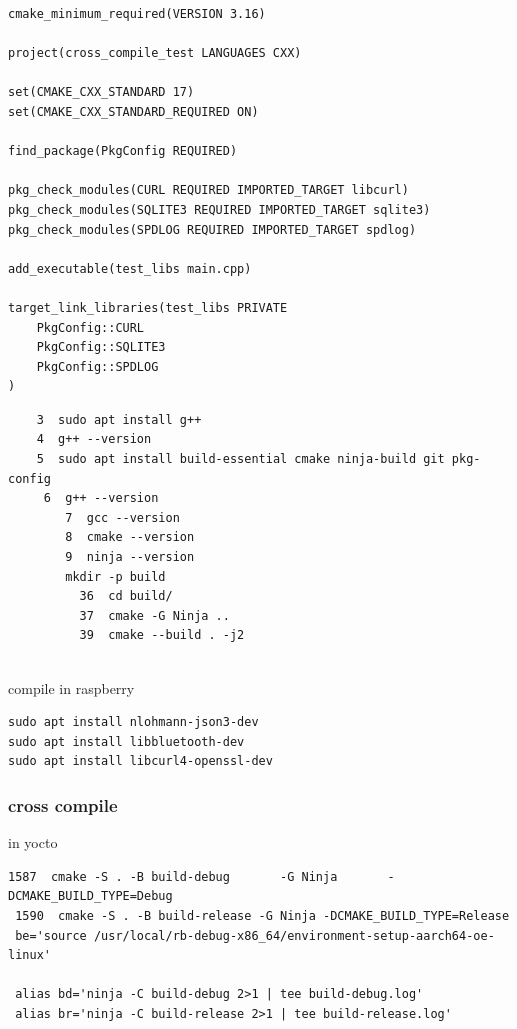 \documentclass[paper=8.5in:11in, twoside, 12pt, pagesize=pdftex]{book}
\begin{document}
\begin{lstlisting}
cmake_minimum_required(VERSION 3.16)

project(cross_compile_test LANGUAGES CXX)

set(CMAKE_CXX_STANDARD 17)
set(CMAKE_CXX_STANDARD_REQUIRED ON)

find_package(PkgConfig REQUIRED)

pkg_check_modules(CURL REQUIRED IMPORTED_TARGET libcurl)
pkg_check_modules(SQLITE3 REQUIRED IMPORTED_TARGET sqlite3)
pkg_check_modules(SPDLOG REQUIRED IMPORTED_TARGET spdlog)

add_executable(test_libs main.cpp)

target_link_libraries(test_libs PRIVATE
    PkgConfig::CURL
    PkgConfig::SQLITE3
    PkgConfig::SPDLOG
)
\end{lstlisting}

\begin{lstlisting}
    3  sudo apt install g++
    4  g++ --version
    5  sudo apt install build-essential cmake ninja-build git pkg-config
     6  g++ --version
        7  gcc --version
        8  cmake --version
        9  ninja --version
        mkdir -p build
          36  cd build/
          37  cmake -G Ninja ..
          39  cmake --build . -j2
          
\end{lstlisting}

compile in raspberry
\begin{lstlisting}
sudo apt install nlohmann-json3-dev
sudo apt install libbluetooth-dev
sudo apt install libcurl4-openssl-dev
\end{lstlisting}

\subsubsection{cross compile}
in yocto
\begin{lstlisting}
1587  cmake -S . -B build-debug       -G Ninja       -DCMAKE_BUILD_TYPE=Debug
 1590  cmake -S . -B build-release -G Ninja -DCMAKE_BUILD_TYPE=Release
 be='source /usr/local/rb-debug-x86_64/environment-setup-aarch64-oe-linux'
 
 alias bd='ninja -C build-debug 2>1 | tee build-debug.log'
 alias br='ninja -C build-release 2>1 | tee build-release.log'
\end{lstlisting}
\end{document}
